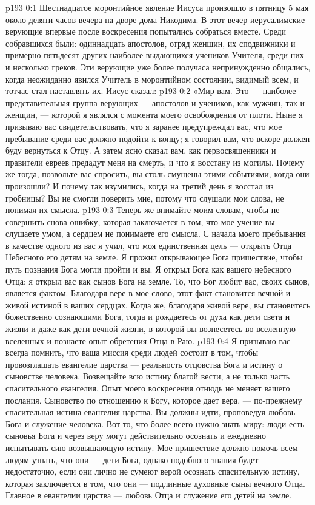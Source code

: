 \author{Комиссия срединников}
\vs p193 0:1 Шестнадцатое моронтийное явление Иисуса произошло в пятницу 5 мая около девяти часов вечера на дворе дома Никодима. В этот вечер иерусалимские верующие впервые после воскресения попытались собраться вместе. Среди собравшихся были: одиннадцать апостолов, отряд женщин, их сподвижники и примерно пятьдесят других наиболее выдающихся учеников Учителя, среди них и несколько греков. Эти верующие уже более получаса непринужденно общались, когда неожиданно явился Учитель в моронтийном состоянии, видимый всем, и тотчас стал наставлять их. Иисус сказал:
\vs p193 0:2 \pc «Мир вам. Это --- наиболее представительная группа верующих --- апостолов и учеников, как мужчин, так и женщин, --- которой я являлся с момента моего освобождения от плоти. Ныне я призываю вас свидетельствовать, что я заранее предупреждал вас, что мое пребывание среди вас должно подойти к концу; я говорил вам, что вскоре должен буду вернуться к Отцу. А затем ясно сказал вам, как первосвященники и правители евреев предадут меня на смерть, и что я восстану из могилы. Почему же тогда, позвольте вас спросить, вы столь смущены этими событиями, когда они произошли? И почему так изумились, когда на третий день я восстал из гробницы? Вы не смогли поверить мне, потому что слушали мои слова, не понимая их смысла.
\vs p193 0:3 Теперь же внимайте моим словам, чтобы не совершить снова ошибку, которая заключается в том, что мое учение вы слушаете умом, а сердцем не понимаете его смысла. С начала моего пребывания в качестве одного из вас я учил, что моя единственная цель --- открыть Отца Небесного его детям на земле. Я прожил открывающее Бога пришествие, чтобы путь познания Бога могли пройти и вы. Я открыл Бога как вашего небесного Отца; я открыл вас как сынов Бога на земле. То, что Бог любит вас, своих сынов, является фактом. Благодаря вере в мое слово, этот факт становится вечной и живой истиной в ваших сердцах. Когда же, благодаря живой вере, вы становитесь божественно сознающими Бога, тогда и рождаетесь от духа как дети света и жизни и даже как дети вечной жизни, в которой вы вознесетесь во вселенную вселенных и познаете опыт обретения Отца в Раю.
\vs p193 0:4 Я призываю вас всегда помнить, что ваша миссия среди людей состоит в том, чтобы провозглашать евангелие царства --- реальность отцовства Бога и истину о сыновстве человека. Возвещайте всю истину благой вести, а не только часть спасительного евангелия. Опыт моего воскресения отнюдь не меняет вашего послания. Сыновство по отношению к Богу, которое дает вера, --- по\hyp{}прежнему спасительная истина евангелия царства. Вы должны идти, проповедуя любовь Бога и служение человека. Вот то, что более всего нужно знать миру: люди есть сыновья Бога и через веру могут действительно осознать и ежедневно испытывать сию возвышающую истину. Мое пришествие должно помочь всем людям узнать, что они --- дети Бога, однако подобного знания будет недостаточно, если они лично не сумеют верой осознать спасительную истину, которая заключается в том, что они --- подлинные духовные сыны вечного Отца. Главное в евангелии царства --- любовь Отца и служение его детей на земле.
